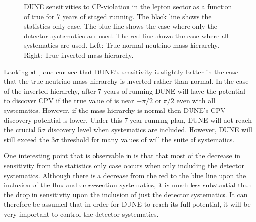 \begin{figure}[h]
	\begin{minipage}[t]{.5\linewidth}
		\begin{adjustbox}{max totalsize=\linewidth, center}
			
		\end{adjustbox}
	\end{minipage}
	\hfill
	\begin{minipage}[t]{.5\linewidth}
		\begin{adjustbox}{max totalsize=\linewidth, center}
			
		\end{adjustbox}
	\end{minipage}
	\caption[DUNE sensitivities to CP-violation in the lepton sector as a function of true \dcp.]{DUNE sensitivities to CP-violation in the lepton sector as a function of true \dcp for 7 years of staged running. The black line shows the statistics only case. The blue line shows the case where only the detector systematics are used. The red line shows the case where all systematics are used. Left: True normal neutrino mass hierarchy. Right: True inverted mass hierarchy.}
	\label{fig:cpvSens}
\end{figure}

Looking at , one can see that DUNE's sensitivity is slightly better in the case that the true neutrino mass hierarchy is inverted rather than normal.
In the case of the inverted hierarchy, after 7 years of running DUNE will have the potential to discover CPV if the true value of \dcp is near $-\pi/2$ or $\pi/2$ even with all systematics.
However, if the mass hierarchy is normal then DUNE's CPV discovery potential is lower. 
Under this 7 year running plan, DUNE will not reach the crucial $5\sigma$ discovery level when systematics are included. 
However, DUNE will still exceed the $3\sigma$ threshold for many values of \dcp will the suite of systematics.

One interesting point that is observable in  is that that most of the decrease in sensitivity from the statistics only case occurs when only including the detector systematics.
Although there is a decrease from the red to the blue line upon the inclusion of the flux and cross-section systematics, it is much less substantial than the drop in sensitivity upon the inclusion of just the detector systematics.
It can therefore be assumed that in order for DUNE to reach its full potential, it will be very important to control the detector systematics.
